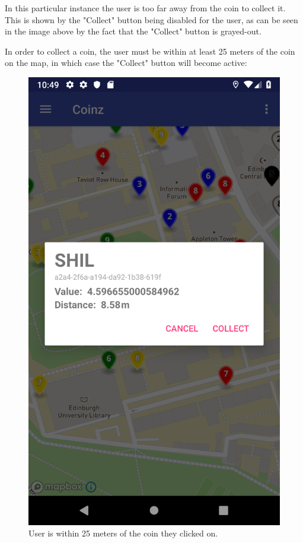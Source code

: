 \documentclass[11pt,a4paper,notitlepage]{article}
\begin{document}
    In this particular instance the user is too far away from the coin to collect it. This is shown by the "Collect" button being disabled for the user, as can be seen in the image above by the fact that the "Collect" button is grayed-out.

    In order to collect a coin, the user must be within at least 25 meters of the coin on the map, in which case the "Collect" button will become active:

\begin{figure}[H]
    \centering
    \includegraphics[scale=0.25]{screenshots/map/collect-coin-in-range.png}
    \caption{User is within 25 meters of the coin they clicked on.}
\end{figure}
\end{document}
